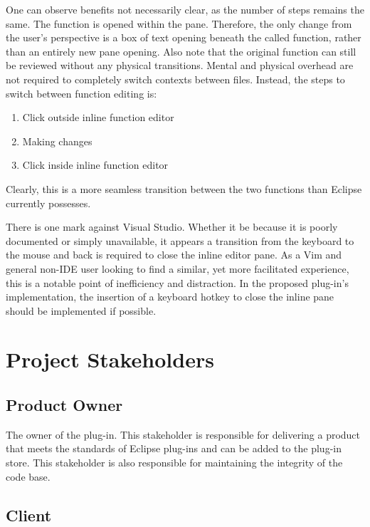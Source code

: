\documentclass[]{report}
\begin{document}
		One can observe benefits not necessarily clear, as the number of steps remains the same.  The function is opened within the pane.  Therefore, the only change from the user's perspective is a box of text opening beneath the called function, rather than an entirely new pane opening.  Also note that the original function can still be reviewed without any physical transitions.  Mental and physical overhead are not required to completely switch contexts between files.  Instead, the steps to switch between function editing is:
		
			\begin{enumerate}
				\item 
				Click outside inline function editor
				
				\item
				Making changes
				
				\item 
				Click inside inline function editor
			\end{enumerate}
		
		Clearly, this is a more seamless transition between the two functions than Eclipse currently possesses.
		
		There is one mark against Visual Studio.  Whether it be because it is poorly documented or simply unavailable, it appears a transition from the keyboard to the mouse and back is required to close the inline editor pane.  As a Vim and general non-IDE user looking to find a similar, yet more facilitated experience, this is a notable point of inefficiency and distraction.  In the proposed plug-in's implementation, the insertion of a keyboard hotkey to close the inline pane should be implemented if possible.

\chapter{Project Stakeholders}

	\section{Product Owner}
	
		The owner of the plug-in.  This stakeholder is responsible for delivering a product that meets the standards of Eclipse plug-ins and can be added to the plug-in store.  This stakeholder is also responsible for maintaining the integrity of the code base.
	
	\section{Client}
	
\end{document}
